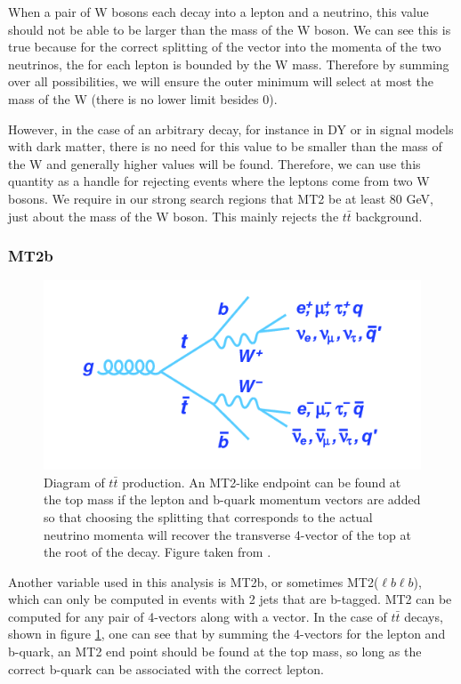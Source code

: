       When a pair of W bosons each decay into a lepton and a neutrino, this value should not be able to be larger than the mass of the W boson. We can see this is true because for the correct splitting of the \MET vector into the momenta of the two neutrinos, the \MT for each lepton is bounded by the W mass. Therefore by summing over all possibilities, we will ensure the outer minimum will select at most the mass of the W (there is no lower limit besides 0). 

      However, in the case of an arbitrary decay, for instance in DY or in signal models with dark matter, there is no need for this value to be smaller than the mass of the W and generally higher values will be found. Therefore, we can use this quantity as a handle for rejecting events where the leptons come from two W bosons. We require in our strong search regions that MT2 be at least 80 GeV, just about the mass of the W boson. This mainly rejects the $t\bar{t}$ background. 

    \subsubsection{MT2b}

      \begin{figure}[h!]
        \centering
        \includegraphics[width=.5\textwidth]{figures/ttbar_diagram.png}
        \caption{Diagram of $t\bar{t}$ production. An MT2-like endpoint can be found at the top mass if the lepton and b-quark momentum vectors are added so that choosing the \MET splitting that corresponds to the actual neutrino momenta will recover the transverse 4-vector of the top at the root of the decay. Figure taken from \cite{TTBar_figure}.}
        \label{fig:ttbar_diagram}
      \end{figure}

      Another variable used in this analysis is MT2b, or sometimes MT2($\ell b \ell b$), which can only be computed in events with 2 jets that are b-tagged. MT2 can be computed for any pair of 4-vectors along with a \MET vector. In the case of $t\bar{t}$ decays, shown in figure \ref{fig:ttbar_diagram}, one can see that by summing the 4-vectors for the lepton and b-quark, an MT2 end point should be found at the top mass, so long as the correct b-quark can be associated with the correct lepton. 

